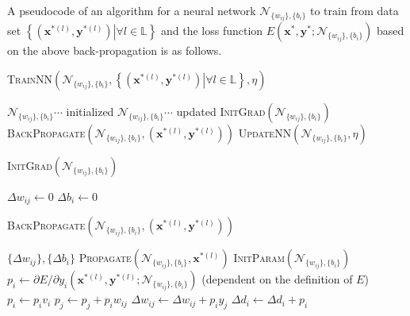 \documentclass{article}
\begin{document}
A pseudocode of an algorithm for a neural network $\mathcal{N}_{\{w_{ij}\},\{b_{i}\}}$
to train from data set $\left\{\left.(\bm{x}^{*(l)},\bm{y}^{*(l)})\right|\forall l\in\mathbb{L}\right\}$
and the loss function $E(\bm{x}^{*},\bm{y}^{*};\mathcal{N}_{\{w_{ij}\},\{b_{i}\}})$
based on the above back-propagation is as follows.
\begin{algorithm}
\caption{\textsc{TrainNN}$(\mathcal{N}_{\{w_{ij}\},\{b_{i}\}},\left\{\left.(\bm{x}^{*(l)},\bm{y}^{*(l)})\right|\forall l\in\mathbb{L}\right\},\eta)$}
\begin{algorithmic}[1]
\Require $\mathcal{N}_{\{w_{ij}\},\{b_{i}\}} \cdots$ initialized
\Ensure $\mathcal{N}_{\{w_{ij}\},\{b_{i}\}} \cdots$ updated
\State \textsc{InitGrad}$(\mathcal{N}_{\{w_{ij}\},\{b_{i}\}})$ 
 
  \State \textsc{BackPropagate}$(\mathcal{N}_{\{w_{ij}\},\{b_{i}\}},(\bm{x}^{*(l)},\bm{y}^{*(l)}))$
\EndFor
\State \textsc{UpdateNN}$(\mathcal{N}_{\{w_{ij}\},\{b_{i}\}},\eta)$ 
\end{algorithmic}
\end{algorithm}

\begin{algorithm}
\caption{\textsc{InitGrad}$(\mathcal{N}_{\{w_{ij}\},\{b_{i}\}})$}
\begin{algorithmic}[1]
    \State $\varDelta w_{ij}\leftarrow 0$
  \EndFor
  \State $\varDelta b_{i}\leftarrow 0$
\EndFor
\end{algorithmic}
\end{algorithm}

\begin{algorithm}
\caption{\textsc{BackPropagate}$(\mathcal{N}_{\{w_{ij}\},\{b_{i}\}},(\bm{x}^{*(l)},\bm{y}^{*(l)}))$}
\begin{algorithmic}[1]
\Ensure $\{\varDelta w_{ij}\},\{\varDelta b_{i}\}$
\State \textsc{Propagate}$(\mathcal{N}_{\{w_{ij}\},\{b_{i}\}},\bm{x}^{*(l)})$
\State \textsc{InitParam}$(\mathcal{N}_{\{w_{ij}\},\{b_{i}\}})$
 
  \State $p_{i}\leftarrow {\partial E}/{\partial y_{i}}(\bm{x}^{*(l)},\bm{y}^{*(l)};\mathcal{N}_{\{w_{ij}\},\{b_{i}\}})$ (dependent on the definition of $E$)
\EndFor
{} 
    \State $p_{i}\leftarrow p_{i}v_{i}$
      \State $p_{j}\leftarrow p_{j}+p_{i}w_{ij}$
      \State $\varDelta w_{ij}\leftarrow\varDelta w_{ij}+p_{i}y_{j}$
    \EndFor
    \State $\varDelta d_{i}\leftarrow\varDelta d_{i}+p_{i}$
  \EndFor
\EndFor
\end{algorithmic}
\end{algorithm}
\end{document}
